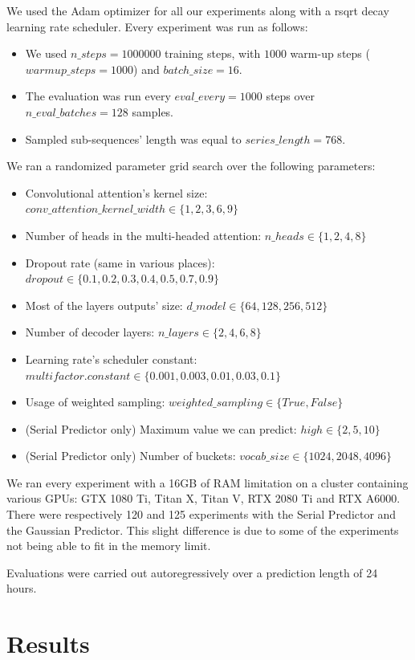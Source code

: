 \documentclass[en]{pracamgr}
\begin{document}
We used the Adam optimizer for all our experiments along with a rsqrt decay learning rate scheduler.
Every experiment was run as follows:
\begin{itemize}
	\item We used $n\_steps = 1000000$ training steps, with $1000$ warm-up steps  ($warmup\_steps = 1000$) and $batch\_size = 16$.
	\item The evaluation was run every $eval\_every = 1000$ steps over $n\_eval\_batches = 128$ samples.
	\item Sampled sub-sequences' length was equal to $series\_length = 768$.
\end{itemize}
We ran a randomized parameter grid search over the following parameters:
\begin{itemize}
	\item Convolutional attention's kernel size: $conv\_attention\_kernel\_width \in \{ 1, 2, 3, 6, 9 \}$
	\item Number of heads in the multi-headed attention: $ n\_heads \in \{ 1, 2, 4, 8 \} $
	\item Dropout rate (same in various places): $dropout \in \{ 0.1, 0.2, 0.3, 0.4, 0.5, 0.7, 0.9 \} $
	\item Most of the layers outputs' size: $d\_model \in \{ 64, 128, 256, 512 \} $
	\item Number of decoder layers: $n\_layers \in \{ 2, 4, 6, 8 \}$
	\item Learning rate's scheduler constant: $multifactor.constant \in \{ 0.001, 0.003, 0.01, 0.03, 0.1 \}$
	\item Usage of weighted sampling: $weighted\_sampling \in \{ True, False \}$
	\item (Serial Predictor only) Maximum value we can predict: $high \in \{2, 5, 10\}$ 
	\item (Serial Predictor only) Number of buckets: $vocab\_size \in \{1024, 2048, 4096\}$ 
\end{itemize}

We ran every experiment with a 16GB of RAM limitation on a cluster containing various GPUs: GTX 1080 Ti, Titan X, Titan V, RTX 2080 Ti and RTX A6000.
There were respectively 120 and 125 experiments with the Serial Predictor and the Gaussian Predictor. This slight difference is due to some of the experiments not being able to fit in the memory limit.


Evaluations were carried out autoregressively over a prediction length of 24 hours.


\section{Results}
\end{document}
